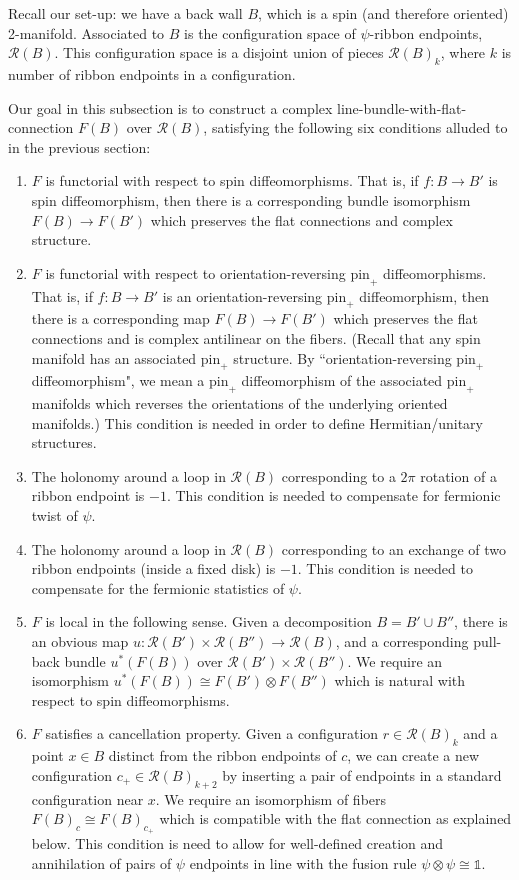 \documentclass[12pt,a4paper]{article}
\newcommand{\tp}{\otimes}
\newcommand{\unit}{\mathds{1}}
\newcommand{\mcr}{\mathcal{R}}
\begin{document}
Recall our set-up: we have a back wall $B$, which is a spin (and therefore oriented) 2-manifold.
Associated to $B$ is the configuration space of $\psi$-ribbon endpoints, $\mcr(B)$.
This configuration space is a disjoint union of pieces $\mcr(B)_k$, where $k$ is number of ribbon endpoints
in a configuration.

Our goal in this subsection is to construct a complex line-bundle-with-flat-connection $F(B)$ over $\mcr(B)$,
satisfying the following six conditions alluded to in the previous section:
\begin{enumerate}
\item $F$ is functorial with respect to spin diffeomorphisms. That is,
if $f: B \to B'$ is spin diffeomorphism, then there is a corresponding bundle isomorphism $F(B) \to F(B')$ which
preserves the flat connections and complex structure.
\item $F$ is functorial with respect to orientation-reversing $\mbox{pin}_+$ diffeomorphisms. That is, 
if $f: B \to B'$ is an orientation-reversing $\mbox{pin}_+$ diffeomorphism, then there is a corresponding map
$F(B) \to F(B')$ which preserves the flat connections and is complex antilinear on the fibers.
(Recall that any spin manifold has an associated $\mbox{pin}_+$ structure.
By ``orientation-reversing $\mbox{pin}_+$ diffeomorphism", we mean a $\mbox{pin}_+$ diffeomorphism
of the associated $\mbox{pin}_+$ manifolds which reverses the orientations of the underlying oriented manifolds.)
This condition is needed in order to define Hermitian/unitary structures.
\item The holonomy around a loop in $\mcr(B)$ corresponding to a $2\pi$ rotation of a ribbon endpoint is $-1$.
This condition is needed to compensate for fermionic twist of $\psi$.
\item The holonomy around a loop in $\mcr(B)$ corresponding to an exchange of two ribbon endpoints 
(inside a fixed disk) is $-1$.
This condition is needed to compensate for the fermionic statistics of $\psi$.
\item $F$ is local in the following sense.
Given a decomposition $B = B'\cup B''$, there is an obvious map $u: \mcr(B')\times\mcr(B'')\to\mcr(B)$, 
and a corresponding pull-back bundle $u^*(F(B))$ over $\mcr(B')\times\mcr(B'')$.
We require an isomorphism $u^*(F(B)) \cong F(B')\otimes F(B'')$ which is natural with respect to spin diffeomorphisms.
\item $F$ satisfies a cancellation property.
Given a configuration $r \in \mcr(B)_k$ and a point $x\in B$ distinct from the ribbon endpoints of $c$,
we can create a new configuration $c_+ \in \mcr(B)_{k+2}$ by inserting a pair of endpoints in a standard configuration
near $x$.
We require an isomorphism of fibers $F(B)_c \cong F(B)_{c_+}$ which is compatible with the flat connection as explained below.
This condition is need to allow for well-defined creation and annihilation of pairs of $\psi$ 
endpoints in line with the fusion rule $\psi \tp \psi \cong \unit$.
\end{enumerate}
\end{document}
